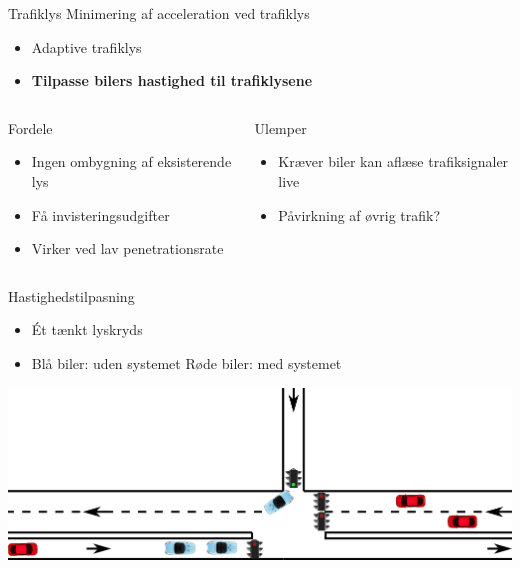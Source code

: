\begin{frame}{Trafiklys}
Minimering af acceleration ved trafiklys
\begin{itemize}
\item Adaptive trafiklys
\item \textbf{Tilpasse bilers hastighed til trafiklysene}
\end{itemize}


\begin{center}
\begin{columns}
\begin{column}{0.5\textwidth}
Fordele
\begin{itemize}
\item Ingen ombygning af eksisterende lys
\item Få invisteringsudgifter 
\item Virker ved lav penetrationsrate
\end{itemize}
\end{column}

\begin{column}{0.5\textwidth}
Ulemper
\begin{itemize}
\item Kræver biler kan aflæse trafiksignaler live
\item Påvirkning af øvrig trafik?
\end{itemize}
\vspace{1cm}
\end{column}
\end{columns}
\end{center}
\end{frame}

\begin{frame}{Hastighedstilpasning}
\begin{itemize}
\item Ét tænkt lyskryds
\item Blå biler: uden systemet \hspace{8mm} Røde biler: med systemet
\end{itemize}
\vspace{3mm}
\includegraphics[width=1\textwidth]{images/eks1.png}
\end{frame}

